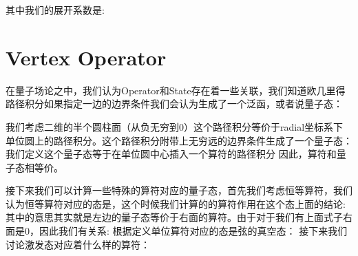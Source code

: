 其中我们的展开系数是:


\newpage
\section{Vertex Operator}
在量子场论之中，我们认为Operator和State存在着一些关联，我们知道欧几里得路径积分如果指定一边的边界条件我们会认为生成了一个泛函，或者说量子态：

我们考虑二维的半个圆柱面（从负无穷到0）这个路径积分等价于radial坐标系下单位圆上的路径积分。这个路径积分附带上无穷远的边界条件生成了一个量子态：
我们定义这个量子态等于在单位圆中心插入一个算符的路径积分
因此，算符\seq{\mA}和量子态\seq{\kit{\mA}}相等价。


接下来我们可以计算一些特殊的算符对应的量子态，首先我们考虑恒等算符，我们认为恒等算符对应的态是，这个时候我们计算的的算符作用在这个态上面的结论:
其中\seq{\equiv}的意思其实就是左边的量子态等价于右面的算符。由于对于我们有上面式子右面是0，因此我们有关系:
根据定义单位算符对应的态是弦的真空态：
\line
接下来我们讨论激发态对应着什么样的算符：







